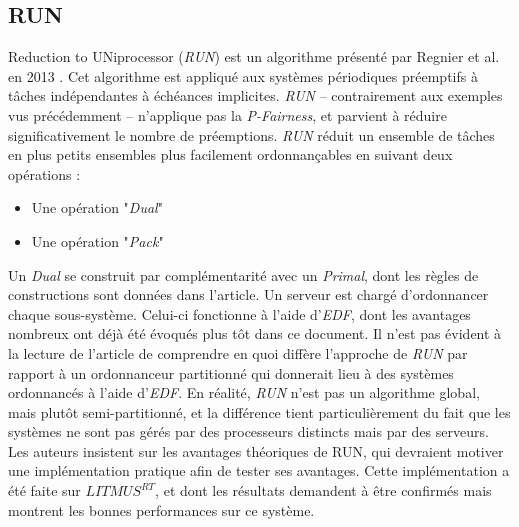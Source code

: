 \documentclass[11pt,a4paper,oneside]{report}
\begin{document}
	\subsection{RUN}
	Reduction to UNiprocessor (\textit{RUN}) est un algorithme présenté par Regnier et al. en 2013 \cite{regnier_multiprocessor_2013}. 
	Cet algorithme est appliqué aux systèmes périodiques préemptifs à tâches indépendantes à 
	échéances implicites. \textit{RUN} -- contrairement aux exemples vus précédemment -- n'applique pas 
	la \textit{P-Fairness}, et parvient à réduire significativement le nombre de préemptions. 
	\textit{RUN} réduit un ensemble de tâches en plus petits ensembles plus facilement ordonnançables 
	en suivant deux opérations :\medskip
	\begin{itemize}
		\item Une opération "\textit{Dual}"
		\item Une opération "\textit{Pack}"
	\end{itemize}
	Un \textit{Dual} se construit par complémentarité avec un \textit{Primal}, dont les règles de constructions sont 
	données dans l'article.
	Un serveur est chargé d'ordonnancer chaque sous-système. Celui-ci fonctionne à l'aide 
	d'\textit{EDF}, dont les avantages nombreux ont déjà été évoqués plus tôt dans ce document. 
	Il n'est pas évident à la lecture de l'article de comprendre en quoi 
	diffère l'approche de \textit{RUN} par rapport à un ordonnanceur 
	partitionné qui donnerait lieu à des systèmes ordonnancés à l'aide d'\textit{EDF}. 
	En réalité, \textit{RUN} n'est pas un algorithme global, mais plutôt 
	semi-partitionné, et la différence tient particulièrement du fait que les systèmes ne sont pas 
	gérés par des processeurs distincts mais par des serveurs.  
	Les auteurs insistent sur les avantages théoriques de RUN, qui devraient motiver une implémentation 
	pratique afin de tester ses avantages. Cette implémentation a été faite 
	\cite{compagnin_putting_2014} sur $LITMUS^{RT}$, et dont les résultats demandent à 
	être confirmés mais montrent les bonnes performances sur ce système.\medskip
	
\end{document}

